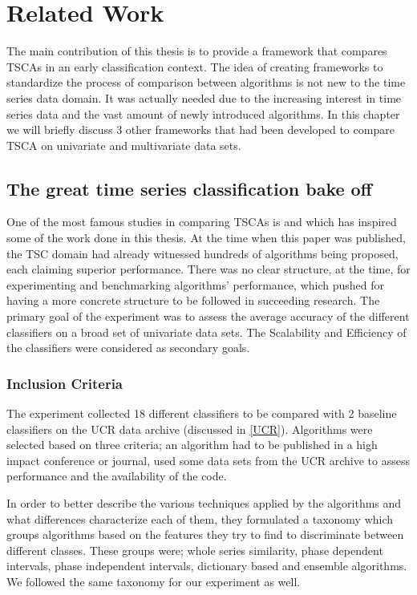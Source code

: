 \chapter{Related Work}
\label{ChapterRelatedWork}
The main contribution of this thesis is to provide a framework that compares TSCAs in an early classification context.
The idea of creating frameworks to standardize the process of comparison between algorithms is not new to the time series data domain.
It was actually needed due to the increasing interest in time series data and the vast amount of newly introduced algorithms.
In this chapter we will briefly discuss 3 other frameworks that had been developed to compare TSCA on univariate and multivariate data sets.

\section{The great time series classification bake off}
\label{GreatBakeoffUnivariate}
One of the most famous studies in comparing TSCAs is \cite{bagnall2017great} and which has inspired some of the work done in this thesis.
At the time when this paper was published, the TSC domain had already witnessed hundreds of algorithms being proposed, each claiming superior performance.
There was no clear structure, at the time, for experimenting and benchmarking algorithms' performance, which pushed for having a more concrete structure to be followed in succeeding research.
The primary goal of the experiment was to assess the average accuracy of the different classifiers on a broad set of univariate data sets.
The Scalability and Efficiency of the classifiers were considered as secondary goals.

\subsection{Inclusion Criteria}
\label{subsectionUniBakeoffInclusion}
The experiment collected 18 different classifiers to be compared with 2 baseline classifiers on the UCR data archive (discussed in \ref{UCR}).
Algorithms were selected based on three criteria; an algorithm had to be published in a high impact conference or journal, used some data sets from the UCR archive to assess performance
and the availability of the code.

In order to better describe the various techniques applied by the algorithms and what differences characterize each of them, they formulated a taxonomy which 
groups algorithms based on the features they try to find to discriminate between different classes.
These groups were; whole series similarity, phase dependent intervals, phase independent intervals, dictionary based and ensemble algorithms.
We followed the same taxonomy for our experiment as well.

